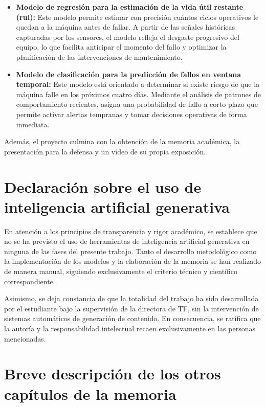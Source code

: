 \documentclass[IB]{TFUOC}
\begin{document}
\begin{itemize}
  \item \textbf{Modelo de regresión para la estimación de la vida útil restante (\gls{rul}):} Este modelo permite
        estimar con precisión cuántos ciclos operativos le quedan a la máquina antes de fallar. A partir de las señales
        históricas capturadas por los sensores, el modelo refleja el desgaste progresivo del equipo, lo que facilita
        anticipar el momento del fallo y optimizar la planificación de las intervenciones de mantenimiento.
  \item \textbf{Modelo de clasificación para la predicción de fallos en ventana temporal:} Este modelo está orientado a
        determinar si existe riesgo de que la máquina falle en los próximos cuatro días. Mediante el análisis de
        patrones de comportamiento recientes, asigna una probabilidad de fallo a corto plazo que permite activar alertas
        tempranas y tomar decisiones operativas de forma inmediata.
\end{itemize}

Además, el proyecto culmina con la obtención de la memoria académica, la presentación para la defensa y un vídeo de su
propia exposición.

\section{Declaración sobre el uso de inteligencia artificial generativa}

En atención a los principios de transparencia y rigor académico, se establece que no se ha previsto el uso de
herramientas de inteligencia artificial generativa en ninguna de las fases del presente trabajo. Tanto el desarrollo
metodológico como la implementación de los modelos y la elaboración de la memoria se han realizado de manera manual,
siguiendo exclusivamente el criterio técnico y científico correspondiente.

Asimismo, se deja constancia de que la totalidad del trabajo ha sido desarrollada por el estudiante bajo la supervisión
de la directora de TF, sin la intervención de sistemas automáticos de generación de contenido. En consecuencia, se
ratifica que la autoría y la responsabilidad intelectual recaen exclusivamente en las personas mencionadas.

\section{Breve descripción de los otros capítulos de la memoria}
\end{document}
